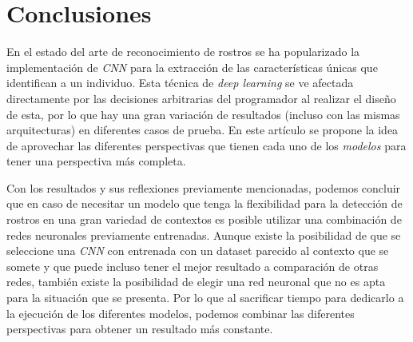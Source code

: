 \documentclass[letterpaper, 10 pt, conference]{ieeeconf}  %
\begin{document}


    \section{Conclusiones}
    En el estado del arte de reconocimiento de rostros se ha popularizado la implementación de
    \textit{CNN} para la extracción de las características únicas que identifican a un individuo.
    Esta técnica de \textit{deep learning} se ve afectada directamente por las decisiones
    arbitrarias del programador al realizar el diseño de esta, por lo que hay una gran variación
    de resultados (incluso con las mismas arquitecturas) en diferentes casos de prueba. En este
    artículo se propone la idea de aprovechar las diferentes perspectivas que tienen cada uno de
    los \textit{modelos} para tener una perspectiva más completa.

    Con los resultados y sus reflexiones previamente mencionadas, podemos concluir que en caso de
    necesitar un modelo que tenga la flexibilidad para la detección de rostros en una gran
    variedad de contextos es posible utilizar una combinación de redes neuronales previamente
    entrenadas. Aunque existe la posibilidad de que se seleccione una \textit{CNN} con entrenada
    con un dataset parecido al contexto que se somete y que puede incluso tener el mejor resultado
    a comparación de otras redes, también existe la posibilidad de elegir una red neuronal que
    no es apta para la situación que se presenta. Por lo que al sacrificar tiempo para dedicarlo a
    la ejecución de los diferentes modelos, podemos combinar las diferentes perspectivas para
    obtener un resultado más constante.
\end{document}
